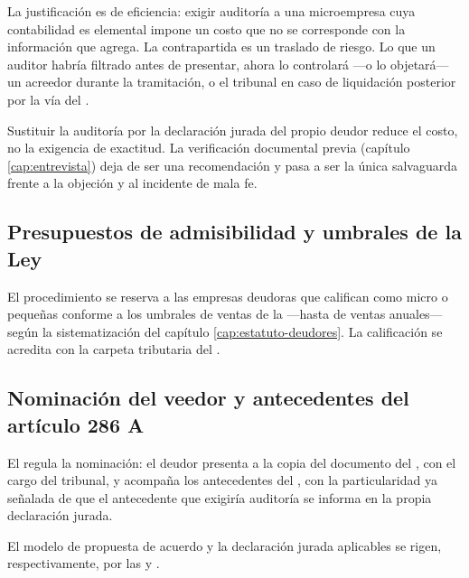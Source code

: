 La justificación es de eficiencia: exigir auditoría a una microempresa cuya contabilidad es
elemental impone un costo que no se corresponde con la información que agrega. La
contrapartida es un traslado de riesgo. Lo que un auditor habría filtrado antes de
presentar, ahora lo controlará ---o lo objetará--- un acreedor durante la tramitación, o el
tribunal en caso de liquidación posterior por la vía del .

\begin{foco}
Sustituir la auditoría por la declaración jurada del propio deudor reduce el costo, no la
exigencia de exactitud. La verificación documental previa (capítulo \ref{cap:entrevista})
deja de ser una recomendación y pasa a ser la única salvaguarda frente a la objeción y al
incidente de mala fe.
\end{foco}

\bloqueNormativo

\subsection{Presupuestos de admisibilidad y umbrales de la Ley }

El procedimiento se reserva a las empresas deudoras que califican como micro o pequeñas
conforme a los umbrales de ventas de la \Lpyme{} \citeyearpar{ley-20416} ---hasta
 de ventas anuales--- según la sistematización del capítulo
\ref{cap:estatuto-deudores}. La calificación se acredita con la carpeta tributaria del
\sii{}.

\subsection{Nominación del veedor y antecedentes del artículo 286 A}

El  regula la nominación: el deudor presenta a la \superir{} copia del documento
del , con el cargo del tribunal, y acompaña los antecedentes del , con la
particularidad ya señalada de que el antecedente que exigiría auditoría se informa en la
propia declaración jurada.

El modelo de propuesta de acuerdo y la declaración jurada aplicables se rigen,
respectivamente, por las  \citeyearpar{ncg-24} y  \citeyearpar{ncg-23}.

